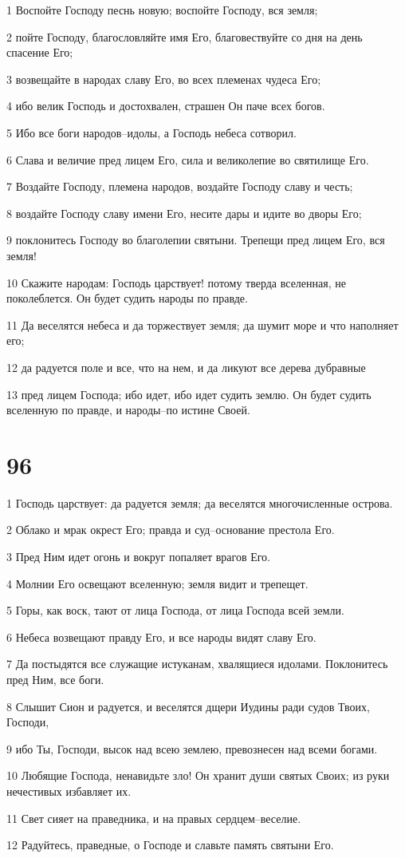 \par 1 Воспойте Господу песнь новую; воспойте Господу, вся земля;
\par 2 пойте Господу, благословляйте имя Его, благовествуйте со дня на день спасение Его;
\par 3 возвещайте в народах славу Его, во всех племенах чудеса Его;
\par 4 ибо велик Господь и достохвален, страшен Он паче всех богов.
\par 5 Ибо все боги народов--идолы, а Господь небеса сотворил.
\par 6 Слава и величие пред лицем Его, сила и великолепие во святилище Его.
\par 7 Воздайте Господу, племена народов, воздайте Господу славу и честь;
\par 8 воздайте Господу славу имени Его, несите дары и идите во дворы Его;
\par 9 поклонитесь Господу во благолепии святыни. Трепещи пред лицем Его, вся земля!
\par 10 Скажите народам: Господь царствует! потому тверда вселенная, не поколеблется. Он будет судить народы по правде.
\par 11 Да веселятся небеса и да торжествует земля; да шумит море и что наполняет его;
\par 12 да радуется поле и все, что на нем, и да ликуют все дерева дубравные
\par 13 пред лицем Господа; ибо идет, ибо идет судить землю. Он будет судить вселенную по правде, и народы--по истине Своей.

\chapter{96}

\par 1 Господь царствует: да радуется земля; да веселятся многочисленные острова.
\par 2 Облако и мрак окрест Его; правда и суд--основание престола Его.
\par 3 Пред Ним идет огонь и вокруг попаляет врагов Его.
\par 4 Молнии Его освещают вселенную; земля видит и трепещет.
\par 5 Горы, как воск, тают от лица Господа, от лица Господа всей земли.
\par 6 Небеса возвещают правду Его, и все народы видят славу Его.
\par 7 Да постыдятся все служащие истуканам, хвалящиеся идолами. Поклонитесь пред Ним, все боги.
\par 8 Слышит Сион и радуется, и веселятся дщери Иудины ради судов Твоих, Господи,
\par 9 ибо Ты, Господи, высок над всею землею, превознесен над всеми богами.
\par 10 Любящие Господа, ненавидьте зло! Он хранит души святых Своих; из руки нечестивых избавляет их.
\par 11 Свет сияет на праведника, и на правых сердцем--веселие.
\par 12 Радуйтесь, праведные, о Господе и славьте память святыни Его.

